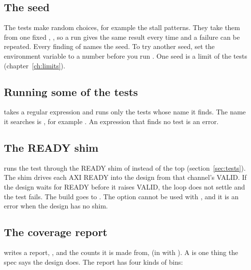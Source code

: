 \subsection{The seed}

The tests make random choices, for example the stall patterns. They take them from one
fixed , , so a run gives the same result every time and a
failure can be repeated. Every finding of  names the seed. To try another seed, set the
environment variable  to a number before you run .
One seed is a limit of the tests (chapter~\ref{ch:limits}).

\subsection{Running some of the tests}

 takes a regular expression and runs only the tests whose name it finds.
The name it searches is , for example
. An expression that finds
no test is an error.

\subsection{The READY shim}

 runs the test 
through the READY shim of  instead of the top (section~\ref{sec:tests}). The
shim drives each AXI READY into the design from that channel's VALID. If the design
waits for READY before it raises VALID, the loop does not settle and the test fails. The
build goes to . The option cannot be used with , and
it is an error when the design has no shim.



\subsection{The coverage report}

 writes a  report, , and the
counts it is made from,  (in  with
). A  is one thing the spec says
the design does. The report has four kinds of bins:

